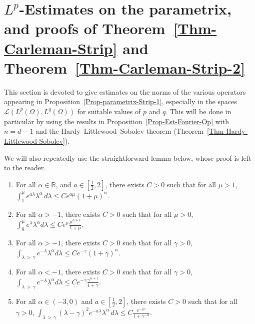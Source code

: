 \documentclass[AHL,Unicode,longabstracts]{cedram}
\newcommand{\scL}{\mathscr{L}}
\newcommand*\R{\mathbb{R}}
\newcommand*\ds{\displaystyle}
\renewcommand{\leq}{\leqslant}
\begin{document}
\section{\texorpdfstring{$L^p$}{Lp}-Estimates on the parametrix, and proofs of Theorem~\ref{Thm-Carleman-Strip} and Theorem~\ref{Thm-Carleman-Strip-2}}\label{Sec-Est-Parametrix}

This section is devoted to give estimates on the norms of the various operators appearing in Proposition~\ref{Prop-parametrix-Strip-1}, especially in the spaces $\scL(L^p(\Omega), L^q(\Omega))$ for suitable values of $p$ and $q$. This will be done in particular by using the results in Proposition~\ref{Prop-Est-Fourier-Op} with $n =d -1$ and the Hardy--Littlewood--Sobolev theorem (Theorem~\ref{Thm-Hardy-Littlewood-Sobolev}).

We will also repeatedly use the straightforward lemma below, whose proof is left to the reader.

\begin{lemm}\label{lem-general-inequalities}\leavevmode
\begin{enumerate}
\item \label{item-1-lemma-6.1}
For all $\alpha \! \in \R$, and $a \! \in \! [\frac{1}{2}, 2]$, there exists $C>0$ such that for all $\mu >1$,\linebreak $
\int_1^\mu e^{a\lambda} \lambda^\alpha \, d\lambda \leq C e^{a \mu} (1+ \mu)^\alpha. $

\item\label{item-2-lemma-6.1}
For all $\alpha >-1$, there exists $C>0$ such that for all $\mu >0$, $
\int_0^\mu e^{\lambda} \lambda^\alpha d\lambda \leq C e^{ \mu} \frac{\mu^{\alpha+1}}{1+ \mu}. $

\item \label{item-3-lemma-6.1}
For all $\alpha > -1$, there exists $C >0$ such that for all $\gamma >0$, $
\int_{\lambda\,>\,\gamma} e^{-\lambda} \lambda^{\alpha} d \lambda \leqslant C e^{-\gamma} (1+ \gamma)^\alpha. $
\item \label{item-4-lemma-6.1}
For all $\alpha < -1$, there exists $C >0$ such that for all $\gamma >0$, $
\int_{\lambda\,>\,\gamma} e^{-\lambda} \lambda^{\alpha} d \lambda \leqslant C e^{-\gamma} \frac{\gamma^{\alpha+1}}{1+\gamma}. $
\item \label{item-5-lemma-6.1}
For all $\alpha \in (-3,0)$ and $a \in [\frac{1}{2}, 2]$, there exists $C >0$ such that for all $\gamma >0$,
$
\int_{\lambda\,>\,\gamma} (\lambda - \gamma)^2 e^{-a \lambda} \lambda^{\alpha} \, d \lambda
\leq C \frac{e^{- a \gamma}}{1+ \gamma^{- \alpha }}. $
\end{enumerate}
\end{lemm}
\end{document}

